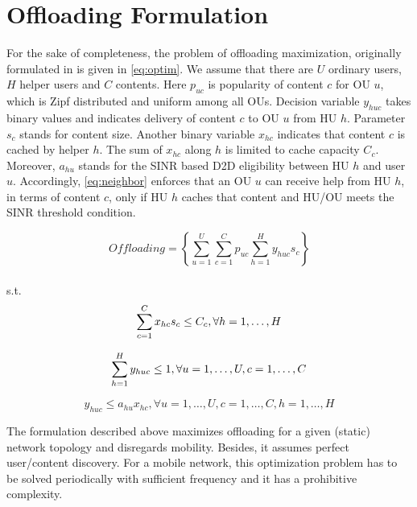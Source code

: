 \documentclass[10pt,a4paper,twocolumn]{article}
\begin{document}
\section{Offloading Formulation}
\label{sec:sec3}

For the sake of completeness, the problem of offloading maximization, originally formulated in \cite{Kazez2019Clustering} is given in \ref{eq:optim}. We assume that there are $U$ ordinary users, $H$ helper users and $C$ contents.  Here $p_{uc}$ is popularity of content $c$ for OU $u$, which is Zipf distributed and uniform among all OUs. Decision variable $y_{huc}$ takes binary values and indicates delivery of content $c$ to OU $u$ from HU $h$. Parameter $s_c$ stands for content size. Another binary variable $x_{hc}$ indicates that content $c$ is cached by helper $h$. The sum of $x_{hc}$ along $h$ is limited to cache capacity $C_c$. Moreover, $a_{hu}$ stands for the SINR based D2D eligibility between HU $h$ and user $u$. Accordingly, \ref{eq:neighbor} enforces that an OU $u$ can receive help from HU $h$, in terms of content $c$, only if HU $h$ caches that content and HU/OU meets the SINR threshold condition.

\begin{equation}\label{eq:optim}
	Offloading= \left\{\sum_{u=1}^{U}\sum_{c=1}^{C}p_{uc}\sum_{h=1}^{H}y_{huc}s_c\right\}
\end{equation}\\
s.t.
\begin{equation}
	\sum_{c=1}^{C} x_{hc}s_c \leq C_c , \forall h=1,\ldots,H \label{eq:cachecap}\\
\end{equation}

\begin{equation}
	\sum_{h=1}^{H}y_{huc} \leq 1, \forall u=1,\ldots,U, c=1,\ldots,C \label{eq:singlehelper} \\
\end{equation}

\begin{equation}
	y_{huc} \leq a_{hu}x_{hc}, \forall u=1,\ldots,U, c=1,\ldots,C, h=1,\ldots,H \label{eq:neighbor}
\end{equation}

The formulation described above maximizes offloading for a given (static) network topology and disregards mobility. Besides, it assumes perfect user/content discovery. For a mobile network, this optimization problem has to be solved periodically with sufficient frequency and it has a prohibitive complexity.
\end{document}
